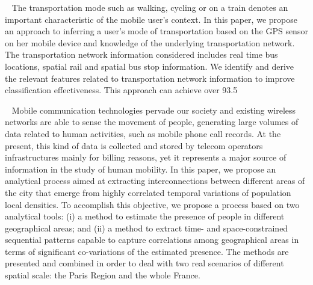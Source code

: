 ~\cite{stenneth2011transportation}
The transportation mode such as walking, cycling or on a train denotes an important characteristic of the mobile user's context. In this paper, we propose an approach to inferring a user's mode of transportation based on the GPS sensor on her mobile device and knowledge of the underlying transportation network. The transportation network information considered includes real time bus locations, spatial rail and spatial bus stop information. We identify and derive the relevant features related to transportation network information to improve classification effectiveness. This approach can achieve over 93.5%

~\cite{trasarti2015discovering}
Mobile communication technologies pervade our society and existing wireless networks are able to sense the movement of people, generating large volumes of data related to human activities, such as mobile phone call records. At the present, this kind of data is collected and stored by telecom operators infrastructures mainly for billing reasons, yet it represents a major source of information in the study of human mobility. In this paper, we propose an analytical process aimed at extracting interconnections between different areas of the city that emerge from highly correlated temporal variations of population local densities. To accomplish this objective, we propose a process based on two analytical tools: (i) a method to estimate the presence of people in different geographical areas; and (ii) a method to extract time- and space-constrained sequential patterns capable to capture correlations among geographical areas in terms of significant co-variations of the estimated presence. The methods are presented and combined in order to deal with two real scenarios of different spatial scale: the Paris Region and the whole France.

